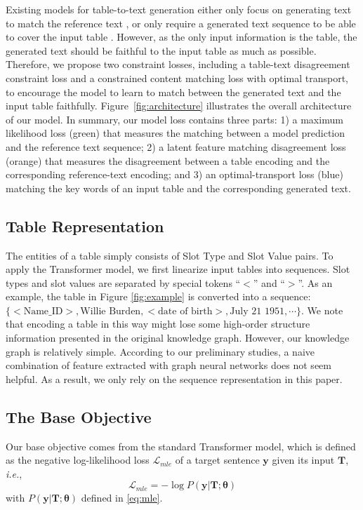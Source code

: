 \documentclass[11pt,a4paper]{article}
\begin{document}
Existing models for table-to-text generation either only focus on generating text to match the reference text \cite{structure2018, Ma2019}, or only require a generated text sequence to be able to cover the input table \cite{Wang2018}. However, as the only input information is the table, the generated text should be faithful to the input table as much as possible. Therefore, we propose two constraint losses, including a table-text disagreement constraint loss and a constrained content matching loss with optimal transport, to encourage the model to learn to match between the generated text and the input table faithfully. Figure~\ref{fig:architecture} illustrates the overall architecture of our model. In summary, our model loss contains three parts: 1) a maximum likelihood loss (green) that measures the matching between a model prediction and the reference text sequence; 2) a latent feature matching disagreement loss (orange) that measures the disagreement between a table encoding and the corresponding reference-text encoding; and 3) an optimal-transport loss (blue) matching the key words of an input table and the corresponding generated text.



\subsection{Table Representation}
The entities of a table simply consists of Slot Type and Slot Value pairs. 
To apply the Transformer model, we first linearize input tables into sequences. Slot types and slot values are separated by special tokens  ``$<$'' and ``$>$''. As an example, the table in Figure \ref{fig:example} is converted into a sequence: $\{<\text{Name\_ID}>, \text{Willie Burden}, <\text{date of birth}>, \text{July 21 1951}, \cdots \}$. 
We note that encoding a table in this way might lose some high-order structure information presented in the original knowledge graph. However, our knowledge graph is relatively simple. According to our preliminary studies, a naive combination of feature extracted with graph neural networks \cite{beck2018} does not seem helpful. 
As a result, we only rely on the sequence representation in this paper.

\subsection{The Base Objective}
Our base objective comes from the standard Transformer model, which is defined as the negative log-likelihood loss $\mathcal{L}_{mle}$ of a target sentence $\bm{y}$ given its input $\bm{T}$, {\it i.e.},
\begin{equation}
    \mathcal{L}_{mle} =  -\log  P(\bm{y}|\bm{T}; \bm{\theta}) 
\end{equation}
with $P(\bm{y}|\bm{T}; \bm{\theta})$ defined in \eqref{eq:mle}.
\end{document}
